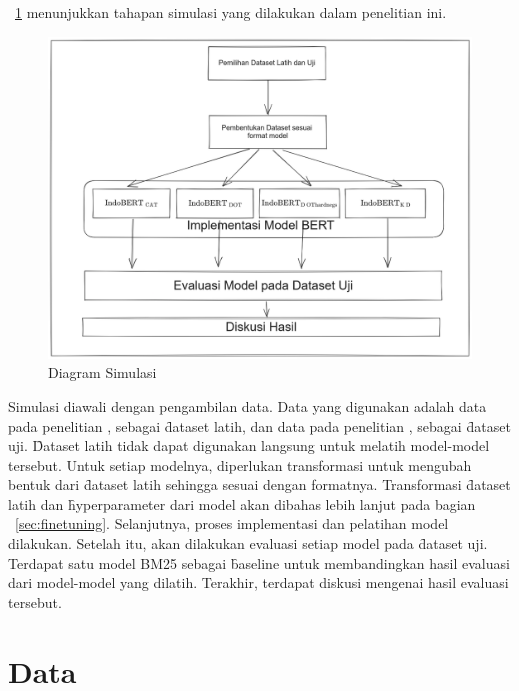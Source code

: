 \pic~\ref{fig:diagram-simulasi} menunjukkan tahapan simulasi yang dilakukan dalam penelitian ini.
\begin{figure}
    \centering
    \includegraphics[width=1\textwidth]{assets/pics/alursimulasi.png}
    \caption{Diagram Simulasi}
    \label{fig:diagram-simulasi}

\end{figure}

Simulasi diawali dengan pengambilan data. Data yang digunakan adalah data pada penelitian \cite{mmarco}, sebagai \f{dataset} latih, dan data pada penelitian \cite{mrtydi}, \cite{miracl} sebagai \f{dataset} uji. \f{Dataset} latih tidak dapat digunakan langsung untuk melatih model-model tersebut. Untuk setiap modelnya, diperlukan transformasi untuk mengubah bentuk dari \f{dataset} latih sehingga sesuai dengan formatnya. Transformasi \f{dataset} latih dan \f{hyperparameter} dari model akan dibahas lebih lanjut pada bagian \sect~\ref{sec:finetuning}. Selanjutnya, proses implementasi dan pelatihan model dilakukan. Setelah itu, akan dilakukan evaluasi setiap model pada \f{dataset} uji. Terdapat satu model BM25 sebagai \f{baseline} untuk membandingkan hasil evaluasi dari model-model yang dilatih. Terakhir, terdapat diskusi mengenai hasil evaluasi tersebut.

\section{Data}
\label{sec:dataset}

